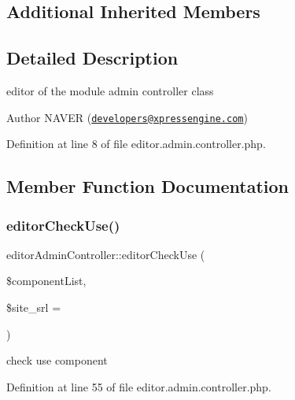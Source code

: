 \subsection*{Additional Inherited Members}


\subsection{Detailed Description}
editor of the module admin controller class 

\begin{DoxyAuthor}{Author}
N\+A\+V\+ER (\href{mailto:developers@xpressengine.com}{\tt developers@xpressengine.\+com}) 
\end{DoxyAuthor}


Definition at line 8 of file editor.\+admin.\+controller.\+php.



\subsection{Member Function Documentation}
\hypertarget{classeditorAdminController_ae4663ef7946d055274d39810ef76198a}{}\label{classeditorAdminController_ae4663ef7946d055274d39810ef76198a} 
\subsubsection{\texorpdfstring{editor\+Check\+Use()}{editorCheckUse()}}
{\footnotesize\ttfamily editor\+Admin\+Controller\+::editor\+Check\+Use (\begin{DoxyParamCaption}\item[{}]{\$component\+List,  }\item[{}]{\$site\+\_\+srl = {} }\end{DoxyParamCaption})}



check use component 



Definition at line 55 of file editor.\+admin.\+controller.\+php.

\hypertarget{classeditorAdminController_a531785272cc7a46e86dce7a308a18286}{}\label{classeditorAdminController_a531785272cc7a46e86dce7a308a18286} 
